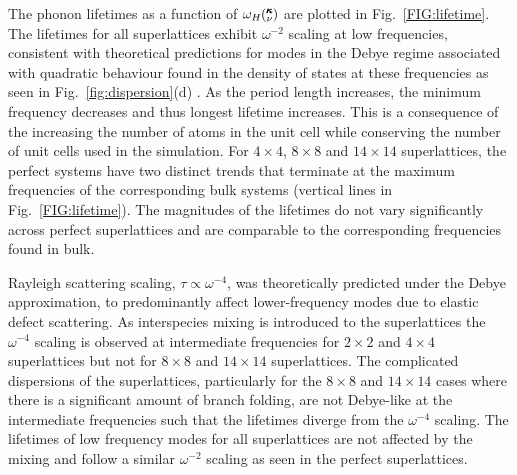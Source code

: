 The phonon lifetimes as a function of $\omega_H \mspace{-4.0mu}\left(\mspace{-8.0mu} \begin{smallmatrix}&\pmb{\kappa} \\&\nu\end{smallmatrix} \mspace{-3.0mu}\right)$ are plotted in Fig.~\ref{FIG:lifetime}. The lifetimes for all superlattices exhibit $\omega^{-2}$ scaling at low frequencies, consistent with theoretical predictions for modes in the Debye regime associated with quadratic behaviour found in the density of states at these frequencies as seen in Fig.~\ref{fig:dispersion}(d) \cite{Klemens_Thermal_1951}. As the period length increases, the minimum frequency decreases and thus longest lifetime increases. This is a consequence of the increasing the number of atoms in the unit cell while conserving the number of unit cells used in the simulation. For $4\times4$, $8\times8$ and $14\times14$ superlattices, the perfect systems have two distinct trends that terminate at the maximum frequencies of the corresponding bulk systems (vertical lines in Fig.~\ref{FIG:lifetime}). The magnitudes of the lifetimes do not vary significantly across perfect superlattices and are comparable to the corresponding frequencies found in bulk.

Rayleigh scattering scaling, $\tau \propto \omega^{-4}$, was theoretically predicted under the Debye approximation, to predominantly affect lower-frequency modes due to elastic defect scattering.\cite{PhysRev.140.A1812,klemens_scattering_1955-3, klemens_thermal_1957-2}
As interspecies mixing is introduced to the superlattices the $\omega^{-4}$ scaling is observed at intermediate frequencies for $2\times2$ and $4\times4$ superlattices but not for $8\times8$ and $14\times14$ superlattices. The complicated dispersions of the superlattices, particularly for the $8\times8$ and $14\times14$ cases where there is a significant amount of branch folding, are not Debye-like at the intermediate frequencies such that the lifetimes diverge from the $\omega^{-4}$ scaling. The lifetimes of low frequency modes for all superlattices are not affected by the mixing and follow a similar $\omega^{-2}$ scaling as seen in the perfect superlattices.

